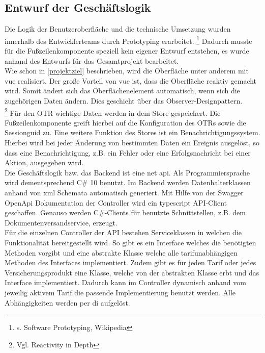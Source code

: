 \subsection{Entwurf der Geschäftslogik}
\label{geschaeftslogik}
Die Logik der Benutzeroberfläche und die technische Umsetzung wurden innerhalb des Entwicklerteams durch Prototyping erarbeitet. \footnote{s.\cite{Prototyping2022} Software Prototyping, Wikipedia}
Dadurch musste für die Fußzeilenkomponente speziell kein eigener Entwurf entstehen, es wurde anhand des Entwurfs für das Gesamtprojekt bearbeitet.\\
Wie schon in \ref{projektziel}  beschrieben, wird die Oberfläche unter anderem mit \gls{vue} realisiert. Der große Vorteil von \gls{vue} ist, dass die Oberfläche reaktiv gemacht wird. Somit ändert sich das Oberflächenelement automatisch, wenn sich die zugehörigen Daten ändern. Dies geschieht über das Observer-Designpattern.\\ \footnote{Vgl.\cite{ReactivityinDepth2022} Reactivity in Depth}
Für den \ac{OTR} wichtige Daten werden in dem Store gespeichert. Die Fußzeilenkomponente greift hierbei auf die Konfiguration des \ac{OTR}s sowie die Sessionguid zu.
Eine weitere Funktion des Stores ist ein Benachrichtigungssystem. Hierbei wird bei jeder Änderung von bestimmten Daten ein Ereignis ausgelöst, so dass eine Benachrichtigung, z.B. ein Fehler oder eine Erfolgsnachricht bei einer Aktion, ausgegeben wird.\\

Die Geschäftslogik bzw. das Backend ist eine \gls{net} \gls{api}. Als Programmiersprache wird dementsprechend C\# 10 benutzt.
Im Backend werden Datenhalterklassen anhand von \gls{xml} Schemata automatisch generiert. Mit Hilfe von der Swagger OpenApi Dokumentation der Controller wird ein \gls{typescript} API-Client geschaffen. Genauso werden C\#-Clients für benutzte Schnittstellen, z.B. dem Dokumentenversandservice, erzeugt.\\
Für die einzelnen Controller der API bestehen Serviceklassen in welchen die Funktionalität bereitgestellt wird. So gibt es ein Interface welches die benötigten Methoden vorgibt und eine abstrakte Klasse welche alle tarifunabhängigen Methoden des Interfaces implementiert. Zudem gibt es für jeden Tarif oder jedes Versicherungsprodukt eine Klasse, welche von der abstrakten Klasse erbt und das Interface implementiert. Dadurch kann im Controller dynamisch anhand vom jeweilig aktivem Tarif die passende Implementierung benutzt werden. %
Alle Abhängigkeiten werden per \gls{di} aufgelöst.
